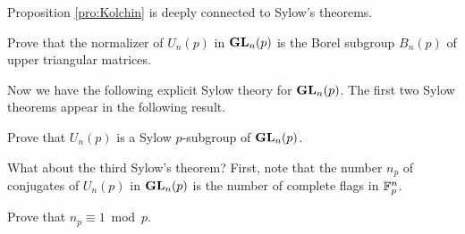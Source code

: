 Proposition \ref{pro:Kolchin} is deeply 
connected to Sylow's theorems. 

\begin{exercise}
    Prove that the normalizer of $U_n(p)$ in $\mathbf{GL}_n(p)$ is the
    Borel subgroup $B_n(p)$ of upper triangular matrices. 
\end{exercise}

Now we have the following explicit Sylow theory for
$\mathbf{GL}_n(p)$. The first two Sylow theorems 
appear in the following result. 

\begin{exercise}
    Prove that  $U_n(p)$ is a Sylow $p$-subgroup of $\mathbf{GL}_n(p)$. 
\end{exercise}

What about the third Sylow's theorem? 
First, note that the number $n_p$
of conjugates of $U_n(p)$ in $\mathbf{GL}_n(p)$ 
is the number of complete flags 
in $\mathbb{F}_p^n$.

\begin{exercise}
    Prove that $n_p\equiv1\bmod p$. 
\end{exercise}

